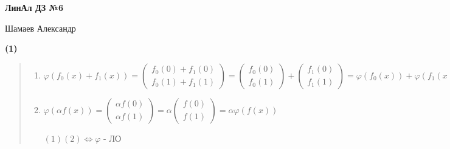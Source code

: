 \documentclass{article}
\begin{document}
\setlength{\parindent}{0pt}
\begin{Large}
    \textsf{\textbf{ЛинАл ДЗ №6}}
    
    Шамаев Александр    
\end{Large}
\vspace{1cm}

\textsf{\textbf{(1)}}
\begin{quote}
\begin{enumerate}
    \item $\varphi (f_0(x) + f_1(x)) = \begin{pmatrix} f_0(0) + f_1(0) \\ f_0(1) + f_1(1) \end{pmatrix} = \begin{pmatrix} f_0(0) \\ f_0(1) \end{pmatrix} + \begin{pmatrix} f_1(0) \\ f_1(1) \end{pmatrix} = \varphi(f_0(x)) + \varphi(f_1(x))$
    
    \item $\varphi (\alpha f(x)) = \begin{pmatrix} \alpha f(0) \\ \alpha f(1) \end{pmatrix} = \alpha \begin{pmatrix} f(0) \\ f(1) \end{pmatrix} = \alpha \varphi(f(x))$

    $(1)(2) \Longleftrightarrow \varphi$ - ЛО

\end{enumerate}
\end{quote}
\end{document}
